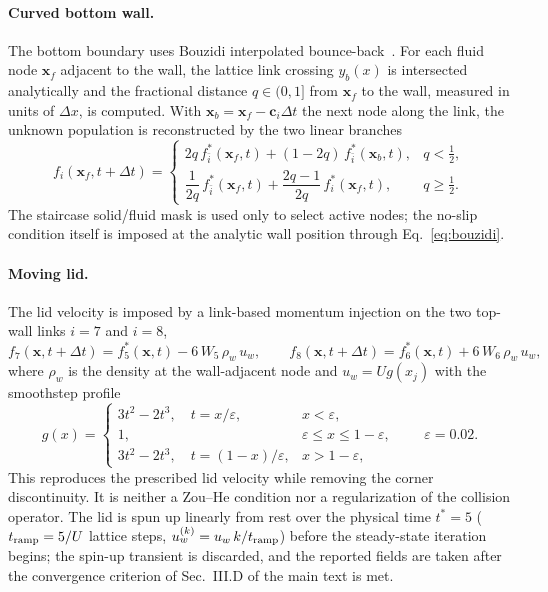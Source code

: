 \paragraph{Curved bottom wall.}
The bottom boundary uses Bouzidi interpolated bounce-back~\cite{Bouzidi2001}. For each fluid node $\mathbf{x}_f$ adjacent to the wall, the lattice link crossing $y_b(x)$ is intersected analytically and the fractional distance $q\in(0,1]$ from $\mathbf{x}_f$ to the wall, measured in units of $\Delta x$, is computed. With $\mathbf{x}_b=\mathbf{x}_f-\mathbf{c}_i\Delta t$ the next node along the link, the unknown population is reconstructed by the two linear branches
\begin{equation}
f_i(\mathbf{x}_f,t+\Delta t)=
\begin{cases}
2q\,f_{\bar i}^*(\mathbf{x}_f,t)+(1-2q)\,f_{\bar i}^*(\mathbf{x}_b,t), & q<\tfrac12,\\[4pt]
\dfrac{1}{2q}\,f_{\bar i}^*(\mathbf{x}_f,t)+\dfrac{2q-1}{2q}\,f_i^*(\mathbf{x}_f,t), & q\ge\tfrac12.
\end{cases}
\label{eq:bouzidi}
\end{equation}
The staircase solid/fluid mask is used only to select active nodes; the no-slip condition itself is imposed at the analytic wall position through Eq.~\eqref{eq:bouzidi}.

\paragraph{Moving lid.}
The lid velocity is imposed by a link-based momentum injection on the two top-wall links $i=7$ and $i=8$,
\begin{equation}
f_7(\mathbf{x},t+\Delta t)=f_5^*(\mathbf{x},t)-6\,W_5\,\rho_w\,u_w,
\qquad
f_8(\mathbf{x},t+\Delta t)=f_6^*(\mathbf{x},t)+6\,W_6\,\rho_w\,u_w,
\label{eq:lid}
\end{equation}
where $\rho_w$ is the density at the wall-adjacent node and $u_w=U g(x_j)$ with the smoothstep profile
\begin{equation}
g(x)=
\begin{cases}
3t^2-2t^3,\quad t=x/\varepsilon, & x<\varepsilon,\\
1, & \varepsilon\le x\le 1-\varepsilon,\\
3t^2-2t^3,\quad t=(1-x)/\varepsilon, & x>1-\varepsilon,
\end{cases}
\qquad \varepsilon=0.02 .
\label{eq:lidprofile}
\end{equation}
This reproduces the prescribed lid velocity while removing the corner discontinuity. It is neither a Zou--He condition nor a regularization of the collision operator. The lid is spun up linearly from rest over the physical time $t^*=5$ ($t_{\rm ramp}=5/U$ lattice steps, $u_w^{(k)}=u_w\,k/t_{\rm ramp}$) before the steady-state iteration begins; the spin-up transient is discarded, and the reported fields are taken after the convergence criterion of Sec.~III.D of the main text is met.

